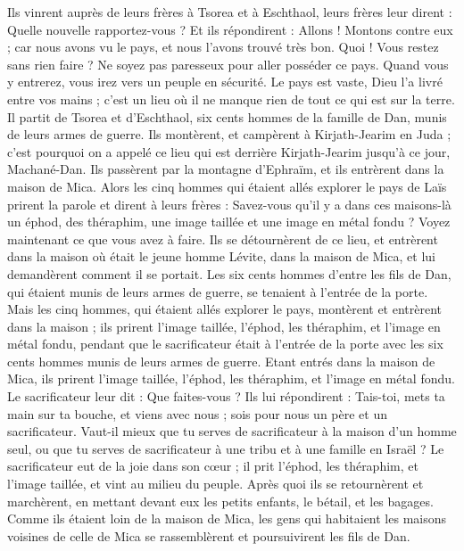 \begin{multicols}{2}
Ils vinrent auprès de leurs frères à Tsorea et à Eschthaol, leurs frères leur dirent : Quelle nouvelle rapportez-vous ?
Et ils répondirent : Allons ! Montons contre eux ; car nous avons vu le pays, et nous l'avons trouvé très bon. Quoi ! Vous restez sans rien faire ? Ne soyez pas paresseux pour aller posséder ce pays.
Quand vous y entrerez, vous irez vers un peuple en sécurité. Le pays est vaste, Dieu l'a livré entre vos mains ; c'est un lieu où il ne manque rien de tout ce qui est sur la terre.
Il partit de Tsorea et d'Eschthaol, six cents hommes de la famille de Dan, munis de leurs armes de guerre.
Ils montèrent, et campèrent à Kirjath-Jearim en Juda ; c'est pourquoi on a appelé ce lieu qui est derrière Kirjath-Jearim jusqu'à ce jour, Machané-Dan.
Ils passèrent par la montagne d'Ephraïm, et ils entrèrent dans la maison de Mica.
Alors les cinq hommes qui étaient allés explorer le pays de Laïs prirent la parole et dirent à leurs frères : Savez-vous qu'il y a dans ces maisons-là un éphod, des théraphim, une image taillée et une image en métal fondu ? Voyez maintenant ce que vous avez à faire.
Ils se détournèrent de ce lieu, et entrèrent dans la maison où était le jeune homme Lévite, dans la maison de Mica, et lui demandèrent comment il se portait.
Les six cents hommes d'entre les fils de Dan, qui étaient munis de leurs armes de guerre, se tenaient à l'entrée de la porte.
Mais les cinq hommes, qui étaient allés explorer le pays, montèrent et entrèrent dans la maison ; ils prirent l'image taillée, l'éphod, les théraphim, et l'image en métal fondu, pendant que le sacrificateur était à l'entrée de la porte avec les six cents hommes munis de leurs armes de guerre.
Etant entrés dans la maison de Mica, ils prirent l'image taillée, l'éphod, les théraphim, et l'image en métal fondu. Le sacrificateur leur dit : Que faites-vous ?
Ils lui répondirent : Tais-toi, mets ta main sur ta bouche, et viens avec nous ; sois pour nous un père et un sacrificateur. Vaut-il mieux que tu serves de sacrificateur à la maison d'un homme seul, ou que tu serves de sacrificateur à une tribu et à une famille en Israël ?
Le sacrificateur eut de la joie dans son cœur ; il prit l'éphod, les théraphim, et l'image taillée, et vint au milieu du peuple.
Après quoi ils se retournèrent et marchèrent, en mettant devant eux les petits enfants, le bétail, et les bagages.
Comme ils étaient loin de la maison de Mica, les gens qui  habitaient les maisons voisines de celle de Mica se rassemblèrent et poursuivirent les fils de Dan.

\end{multicols}
